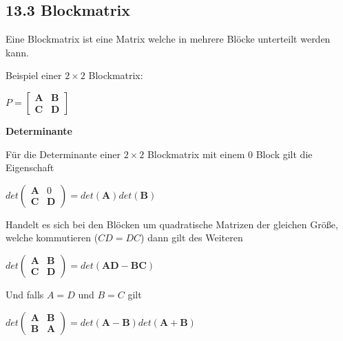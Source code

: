 \subsection{13.3 Blockmatrix}{
\vskip1pt

Eine Blockmatrix ist eine Matrix welche in mehrere \grqq{}Blöcke\grqq{} unterteilt werden kann.\par

Beispiel einer $2 \times 2$ Blockmatrix:
\begin{center}
$P = \begin{bmatrix}
			\pmb A & \pmb B \\
			\pmb C & \pmb D
	 \end{bmatrix}$
\end{center}

\textbf{Determinante}\par\vskip1pt
Für die Determinante einer $2 \times 2$ Blockmatrix mit einem 0 Block gilt die Eigenschaft\par\vspace{-4pt}
\begin{center}
$det\begin{pmatrix} \pmb A & 0\\	\pmb C & \pmb D\end{pmatrix} = det(\pmb A)det(\pmb B)$
\end{center}\par\vskip3pt

Handelt es sich bei den Blöcken um quadratische Matrizen der gleichen Größe, welche kommutieren ($CD = DC$) dann gilt des Weiteren\par\vspace{-4pt}
\begin{center}
$det\begin{pmatrix} \pmb A & \pmb B\\ \pmb C & \pmb D\end{pmatrix} = det(\pmb{AD} - \pmb{BC})$
\end{center}\par\vskip3pt

Und falls $A=D$ und $B=C$ gilt\par\vspace{-4pt}
\begin{center}
$det\begin{pmatrix} \pmb A & \pmb B\\ \pmb B & \pmb A\end{pmatrix} = det(\pmb A - \pmb B)det(\pmb A + \pmb B)$
\end{center}\par\vskip3pt


}
